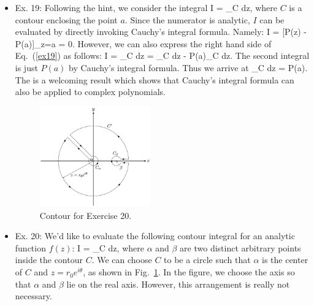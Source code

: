 \documentclass[10pt, letterpaper]{article}
\begin{document}
\begin{itemize}
\begin{enumerate}
	\end{enumerate}

	\item Ex. 19:
	Following the hint, we consider the integral
	\be
		I = \oint_C dz,
		\label{ex19}
	\ee
	where $C$ is a contour enclosing the point $a$. Since the numerator is analytic, $I$ can be evaluated by
	directly invoking Cauchy's integral formula. Namely:
	\be
		I = [P(z) - P(a)]_{z=a} = 0. \nonumber
	\ee
	However, we can also express the right hand side of Eq.~(\ref{ex19}) as follows:
	\be
		I = \oint_C dz = \oint_C dz 
			- P(a)\cdot{}\oint_C dz.
		\nonumber
	\ee
	The second integral is just $P(a)$ by Cauchy's integral formula. Thus we arrive at
	\be
		\oint_C dz = P(a).
	\ee
	The is a welcoming result which shows that Cauchy's integral formula can also be applied to complex
	polynomials.


	\begin{figure}
	\includegraphics[width=0.45\textwidth]{./figures/fig_ex20.pdf}
	\caption{Contour for Exercise 20.}
	\label{fig:ex20}
	\end{figure}

	\item Ex. 20:
	We'd like to evaluate the following contour integral for an analytic function $f(z)$:
	\be
		I = \oint_C dz, \nonumber
	\ee
	where $\alpha$ and $\beta$ are two distinct arbitrary points inside the contour $C$. We can choose $C$
	to be a circle such that $\alpha$ is the center of $C$ and $z=r_0 e^{i\theta}$, as shown in Fig.~\ref{fig:ex20}.
	In the figure, we choose the axis so that $\alpha$ and $\beta$ lie on the real axis. However, this arrangement
	is really not necessary. 


\end{itemize}
\end{document}
